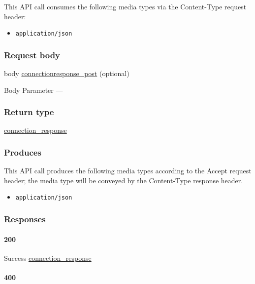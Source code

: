 This API call consumes the following media types via the {Content-Type}
request header:

\begin{itemize}
\tightlist
\item
  \texttt{application/json}
\end{itemize}

\hypertarget{request-body-17}{%
\subsubsection{Request body}\label{request-body-17}}

body
\protect\hyperlink{connectionresponse_post}{connectionresponse\_post}
(optional)

{Body Parameter} ---

\hypertarget{return-type-45}{%
\subsubsection{Return type}\label{return-type-45}}

\protect\hyperlink{connection_response}{connection\_response}

\hypertarget{produces-56}{%
\subsubsection{Produces}\label{produces-56}}

This API call produces the following media types according to the
{Accept} request header; the media type will be conveyed by the
{Content-Type} response header.

\begin{itemize}
\tightlist
\item
  \texttt{application/json}
\end{itemize}

\hypertarget{responses-56}{%
\subsubsection{Responses}\label{responses-56}}

\hypertarget{section-184}{%
\paragraph{200}\label{section-184}}

Success \protect\hyperlink{connection_response}{connection\_response}

\hypertarget{section-185}{%
\paragraph{400}\label{section-185}}


